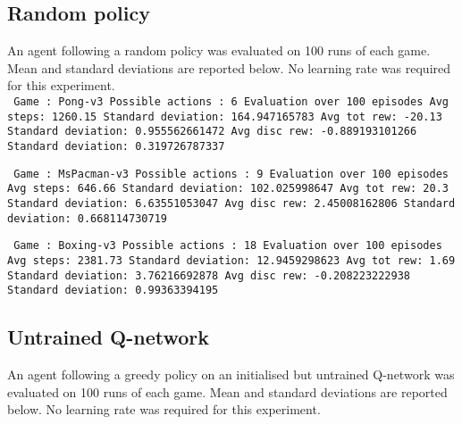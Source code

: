\documentclass[paper=a4, fontsize=11pt]{scrartcl} %
\numberwithin{equation}{section} %
\numberwithin{figure}{section} %
\numberwithin{table}{section} %
\begin{document}
\subsection{Random policy}
An agent following a random policy was evaluated on 100 runs of each game. Mean and standard deviations are reported below. No learning rate was required for this experiment.\\

\texttt{
Game : Pong-v3 \newline
Possible actions : 6 \newline
Evaluation over 100 episodes \newline
Avg steps: 1260.15 \quad\quad\quad\quad\quad\quad\quad  Standard deviation: 164.947165783 \newline
Avg tot rew: -20.13 \quad\quad\quad\quad\quad\quad\quad  Standard deviation: 0.955562661472 \newline
Avg disc rew: -0.889193101266 \quad\quad Standard deviation: 0.319726787337 \newline
}

\texttt{
Game : MsPacman-v3 \newline
Possible actions : 9 \newline
Evaluation over 100 episodes \newline
Avg steps: 646.66 \quad\quad\quad\quad\quad\quad\quad\quad  Standard deviation: 102.025998647 \newline
Avg tot rew: 20.3 \quad\quad\quad\quad\quad\quad\quad\quad Standard deviation: 6.63551053047 \newline
Avg disc rew: 2.45008162806 \quad\quad\quad  Standard deviation: 0.668114730719\newline
}

\texttt{
Game : Boxing-v3 \newline
Possible actions : 18 \newline
Evaluation over 100 episodes \newline
Avg steps: 2381.73 \quad\quad\quad\quad\quad\quad\quad\quad\quad Standard deviation: 12.9459298623 \newline
Avg tot rew: 1.69 \quad\quad\quad\quad\quad\quad\quad\quad\quad  Standard deviation: 3.76216692878 \newline
Avg disc rew: -0.208223222938 \quad\quad\quad  Standard deviation: 0.99363394195 \newline
}


\subsection{Untrained Q-network}
An agent following a greedy policy on an initialised but untrained Q-network was evaluated on 100 runs of each game. Mean and standard deviations are reported below. No learning rate was required for this experiment.\\
\end{document}
